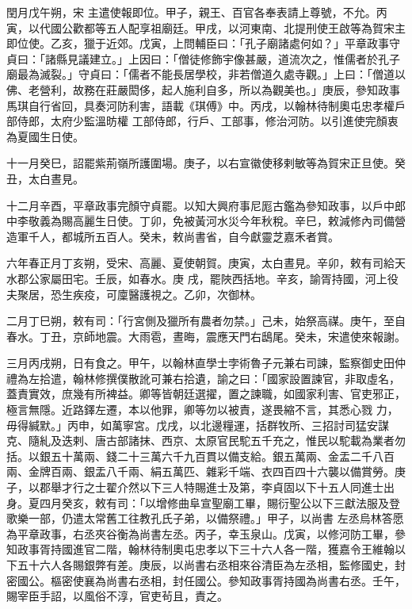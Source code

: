 \begin{pinyinscope}
 閏月戊午朔，宋
 主遣使報即位。甲子，親王、百官各奉表請上尊號，不允。丙寅，以代國公歡都等五人配享祖廟廷。甲戌，以河東南、北提刑使王啟等為賀宋主即位使。乙亥，獵于近郊。戊寅，上問輔臣曰：「孔子廟諸處何如？」平章政事守貞曰：「諸縣見議建立。」上因曰：「僧徒修飾宇像甚嚴，道流次之，惟儒者於孔子廟最為滅裂。」守貞曰：「儒者不能長居學校，非若僧道久處寺觀。」上曰：「僧道以佛、老營利，故務在莊嚴閎侈，起人施利自多，所以為觀美也。」庚辰，參知政事馬琪自行省回，具奏河防利害，語載《琪傅》中。丙戌，以翰林待制奧屯忠孝權戶部侍郎，太府少監溫昉權
 工部侍郎，行戶、工部事，修治河防。以引進使完顏衷為夏國生日使。



 十一月癸巳，詔罷紫荊嶺所護圍場。庚子，以右宣徽使移剌敏等為賀宋正旦使。癸丑，太白晝見。



 十二月辛酉，平章政事完顏守貞罷。以知大興府事尼厖古鑑為參知政事，以戶中郎中李敬義為賜高麗生日使。丁卯，免被黃河水災今年秋稅。辛巳，敕減修內司備營造軍千人，都城所五百人。癸未，敕尚書省，自今獻靈芝嘉禾者賞。



 六年春正月丁亥朔，受宋、高麗、夏使朝賀。庚寅，太白晝見。辛卯，敕有司給天水郡公家屬田宅。壬辰，如春水。庚
 戌，罷陜西括地。辛亥，諭胥持國，河上役夫聚居，恐生疾疫，可廩醫護視之。乙卯，次御林。



 二月丁巳朔，敕有司：「行宮側及獵所有農者勿禁。」己未，始祭高禖。庚午，至自春水。丁丑，京師地震。大雨雹，晝晦，震應天門右鴟尾。癸未，宋遣使來報謝。



 三月丙戌朔，日有食之。甲午，以翰林直學士孛術魯子元兼右司諫，監察御史田仲禮為左拾遣，翰林修撰僕散訛可兼右拾遺，諭之曰：「國家設置諫官，非取虛名，蓋責實效，庶幾有所裨益。卿等皆朝廷選擢，置之諫職，如國家利害、官吏邪正，極言無隱。近路鐸左遷，本以他罪，卿等勿以被責，遂畏縮不言，其悉心戮
 力，毋得緘默。」丙申，如萬寧宮。戊戌，以北邊糧運，括群牧所、三招討司猛安謀克、隨糺及迭剌、唐古部諸抹、西京、太原官民駝五千充之，惟民以駝載為業者勿括。以銀五十萬兩、錢二十三萬六千九百貫以備支給。銀五萬兩、金盂二千八百兩、金牌百兩、銀盂八千兩、絹五萬匹、雜彩千端、衣四百四十六襲以備賞勞。庚子，以郡舉才行之士翟介然以下三人特賜進士及第，李貞固以下十五人同進士出身。夏四月癸亥，敕有司：「以增修曲阜宣聖廟工畢，賜衍聖公以下三獻法服及登歌樂一部，仍遣太常舊工往教孔氏子弟，以備祭禮。」甲子，以尚書
 左丞烏林答愿為平章政事，右丞夾谷衡為尚書左丞。丙子，幸玉泉山。戊寅，以修河防工畢，參知政事胥持國進官二階，翰林待制奧屯忠孝以下三十六人各一階，獲嘉令王維翰以下五十六人各賜銀弊有差。庚辰，以尚書右丞相來谷清臣為左丞相，監修國史，封密國公。樞密使襄為尚書右丞相，封任國公。參知政事胥持國為尚書右丞。壬午，賜宰臣手詔，以風俗不淳，官吏茍且，責之。




\end{pinyinscope}
